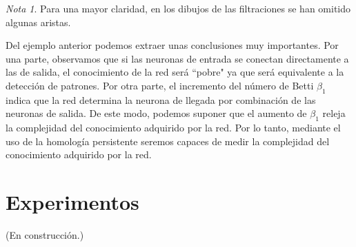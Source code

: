\documentclass[12pt]{article}
\numberwithin{equation}{section}
\theoremstyle{definition}
\newenvironment{ejem}
  {\pushQED{\qed}\renewcommand{\qedsymbol}{$\blacktriangleleft$}\ejemplo}
  {\popQED\endejemplo}
\theoremstyle{remark}
\newtheorem*{remark}{Nota}
\theoremstyle{plain}
\begin{document}
\begin{ejem}
\begin{figure}[H]
\begin{figure}[H]
					\end{figure}
				\endminipage
					\begin{figure}[H]
					\end{figure}
				\endminipage
			\end{figure}
			\begin{remark}
				Para una mayor claridad, en los dibujos de las filtraciones se han omitido algunas aristas.
			\end{remark}
		\end{ejem}	
		Del ejemplo anterior podemos extraer unas conclusiones muy importantes. Por una parte, observamos que si las neuronas de entrada se conectan
		directamente a las de salida, el conocimiento de la red será ``pobre" ya que será equivalente a la detección de patrones. Por otra parte,
		el incremento del número de Betti $\beta_{1}$ indica que la red determina la neurona de llegada por combinación de las neuronas de salida. De este modo,
		podemos suponer que el aumento de $\beta_{1}$ releja la complejidad del conocimiento adquirido por la red. Por lo tanto, mediante el uso de la homología persistente
		seremos capaces de medir la complejidad del conocimiento adquirido por la red.
	
	\section{Experimentos}
		(En construcción.)
\end{document}
